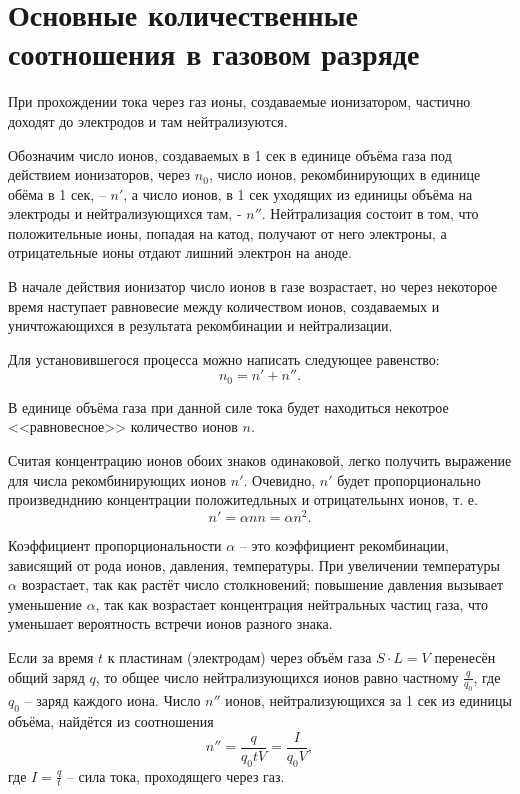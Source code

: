 \documentclass[a4paper,10pt]{book}
\begin{document}
\section{Основные количественные соотношения в газовом разряде}

При прохождении тока через газ ионы, создаваемые ионизатором, частично доходят до электродов и там нейтрализуются.

Обозначим число ионов, создаваемых в 1$\textit{ сек}$ в единице объёма газа под действием ионизаторов, через $n_0$, число ионов, рекомбинирующих в единице обёма в 1$\textit{ сек}$, -- $n'$,  а число ионов, в 1$\textit{ сек}$ уходящих из единицы объёма на электроды и нейтрализующихся там, - $n''$. Нейтрализация состоит в том, что положительные ионы, попадая на катод, получают от него электроны, а отрицательные ионы отдают лишний электрон на аноде.

В начале действия ионизатор число ионов в газе возрастает, но через некоторое время наступает равновесие между количеством ионов, создаваемых и уничтожающихся в результата рекомбинации и нейтрализации.

Для установившегося процесса можно написать следующее равенство:
\begin{equation}\label{23.1}
n_0 = n' + n''.
\end{equation}

В единице объёма газа при данной силе тока будет находиться некотрое <<равновесное>> количество ионов $n$.

Считая концентрацию ионов обоих знаков одинаковой, легко получить выражение для числа рекомбинирующих ионов $n'$. Очевидно, $n'$ будет пропорционально произведнднию концентрации положитедльных и отрицательынх ионов, т. е.\begin{equation}\label{23.2}
n' = \alpha n n = \alpha n^2.
\end{equation}

Коэффициент пропорциональности $\alpha$ -- это коэффициент рекомбинации, зависящий от рода ионов, давления, температуры. При увеличении температуры $\alpha$ возрастает, так как растёт число столкновений; повышение давления вызывает уменьшение $\alpha$, так как возрастает концентрация нейтральных частиц газа, что уменьшает вероятность встречи ионов разного знака.

Если за время $t$ к пластинам (электродам) через объём газа $S\cdot L=V$ перенесён общий заряд $q$, то общее число нейтрализующихся ионов равно частному $\frac{q}{q_0}$, где $q_0$ -- заряд каждого иона. Число $n''$ ионов, нейтрализующихся за 1$\textit{ сек}$ из единицы объёма, найдётся из соотношения \begin{equation}\label{23.3}
	n'' = \frac{q}{q_0 tV} = \frac{I}{q_0 V},
\end{equation}где $I = \frac{q}{t}$ -- сила тока, проходящего через газ.
\end{document}
